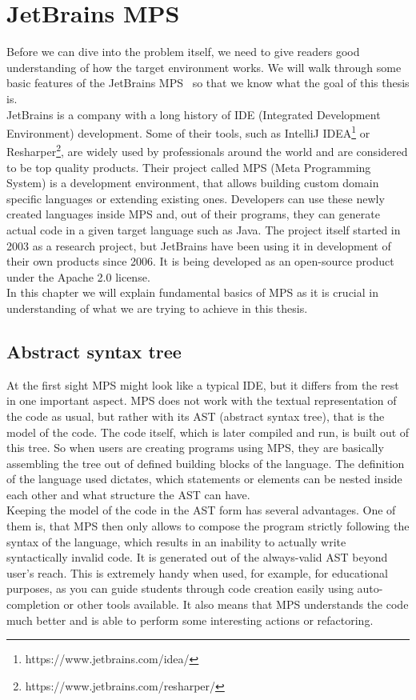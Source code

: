 \chapter{JetBrains MPS}

Before we can dive into the problem itself, we need to give readers good understanding of how the target environment works. We will walk through some basic features of the JetBrains MPS~\cite{MPS} so that we know what the goal of this thesis is.
\\

JetBrains is a company with a long history of IDE (Integrated Development Environment) development. Some of their tools, such as IntelliJ IDEA\footnote{https://www.jetbrains.com/idea/} or Resharper\footnote{https://www.jetbrains.com/resharper/}, are widely used by professionals around the world and are considered to be top quality products. Their project called MPS (Meta Programming System) is a development environment, that allows building custom domain specific languages or extending existing ones. Developers can use these newly created languages inside MPS and, out of their programs, they can generate actual code in a given target language such as Java. The project itself started in 2003 as a research project, but JetBrains have been using it in development of their own products since 2006. It is being developed as an open-source product under the Apache 2.0 license.
\\

In this chapter we will explain fundamental basics of MPS as it is crucial in understanding of what we are trying to achieve in this thesis.

\section{Abstract syntax tree}
At the first sight MPS might look like a typical IDE, but it differs from the rest in one important aspect. MPS does not work with the textual representation of the code as usual, but rather with its AST (abstract syntax tree), that is the model of the code. The code itself, which is later compiled and run, is built out of this tree. So when users are creating programs using MPS, they are basically assembling the tree out of defined building blocks of the language. The definition of the language used dictates, which statements or elements can be nested inside each other and what structure the AST can have. 
\\

Keeping the model of the code in the AST form has several advantages. One of them is, that  MPS then only allows to compose the program strictly following the syntax of the language, which results in an inability to actually write syntactically invalid code. It is generated out of the always-valid AST beyond user's reach. This is extremely handy when used, for example, for educational purposes, as you can guide students through code creation easily using auto-completion or other tools available. It also means that MPS understands the code much better and is able to perform some interesting actions or refactoring.
\\

